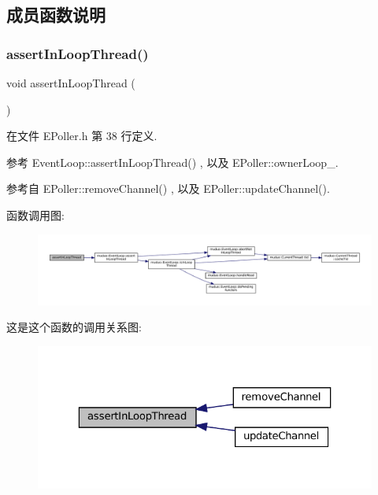 \subsection{成员函数说明}
\mbox{\label{classmuduo_1_1EPoller_a9e9c23193ece3ba25a1a2779fc7ebc2d}} 
\subsubsection{\texorpdfstring{assert\+In\+Loop\+Thread()}{assertInLoopThread()}}
{\footnotesize\ttfamily void assert\+In\+Loop\+Thread (\begin{DoxyParamCaption}{ }\end{DoxyParamCaption})\hspace{0.3cm}{\ttfamily [inline]}}



在文件 E\+Poller.\+h 第 38 行定义.



参考 Event\+Loop\+::assert\+In\+Loop\+Thread() , 以及 E\+Poller\+::owner\+Loop\+\_\+.



参考自 E\+Poller\+::remove\+Channel() , 以及 E\+Poller\+::update\+Channel().

函数调用图\+:
\nopagebreak
\begin{figure}[H]
\begin{center}
\leavevmode
\includegraphics[width=350pt]{classmuduo_1_1EPoller_a9e9c23193ece3ba25a1a2779fc7ebc2d_cgraph}
\end{center}
\end{figure}
这是这个函数的调用关系图\+:
\nopagebreak
\begin{figure}[H]
\begin{center}
\leavevmode
\includegraphics[width=323pt]{classmuduo_1_1EPoller_a9e9c23193ece3ba25a1a2779fc7ebc2d_icgraph}
\end{center}
\end{figure}
\mbox{\label{classmuduo_1_1EPoller_a93b3d6d6cac94e92c2ddfd91e9b18cc0}} 
